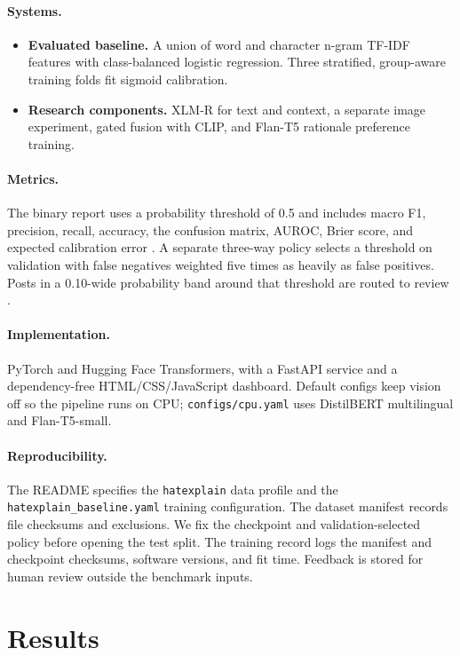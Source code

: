 \documentclass[11pt]{article}
\begin{document}
\paragraph{Systems.}
\begin{itemize}
    \item \textbf{Evaluated baseline.} A union of word and character n-gram TF-IDF features with class-balanced logistic regression. Three stratified, group-aware training folds fit sigmoid calibration.
    \item \textbf{Research components.} XLM-R for text and context, a separate image experiment, gated fusion with CLIP, and Flan-T5 rationale preference training.
\end{itemize}

\paragraph{Metrics.}
The binary report uses a probability threshold of 0.5 and includes macro F1, precision, recall, accuracy, the confusion matrix, AUROC, Brier score, and expected calibration error \cite{guo2017calibration}. A separate three-way policy selects a threshold on validation with false negatives weighted five times as heavily as false positives. Posts in a 0.10-wide probability band around that threshold are routed to review \cite{madras2018predict}.

\paragraph{Implementation.}
PyTorch and Hugging Face Transformers, with a FastAPI service and a dependency-free HTML/CSS/JavaScript dashboard. Default configs keep vision off so the pipeline runs on CPU; \texttt{configs/cpu.yaml} uses DistilBERT multilingual and Flan-T5-small.

\paragraph{Reproducibility.}
The README specifies the \texttt{hatexplain} data profile and the \texttt{hatexplain\_baseline.yaml} training configuration. The dataset manifest records file checksums and exclusions. We fix the checkpoint and validation-selected policy before opening the test split. The training record logs the manifest and checkpoint checksums, software versions, and fit time. Feedback is stored for human review outside the benchmark inputs.

\section{Results}
\end{document}
